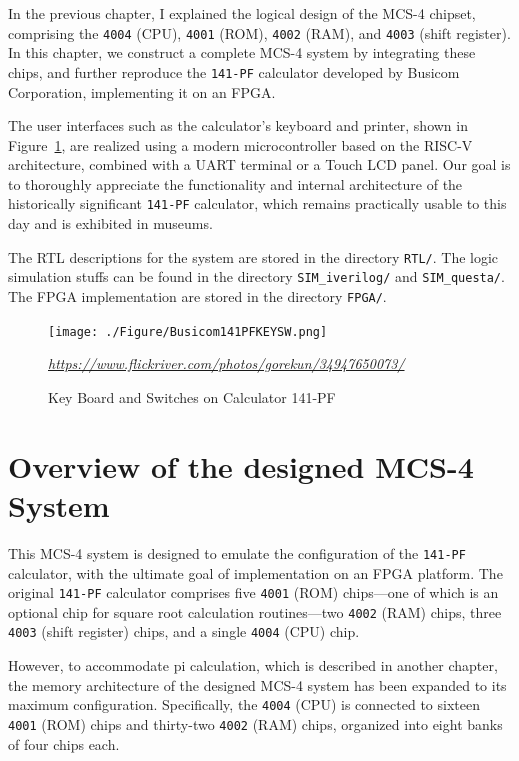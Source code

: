 In the previous chapter, I explained the logical design of the MCS-4 chipset, comprising the \texttt{4004} (CPU), \texttt{4001} (ROM), \texttt{4002} (RAM), and \texttt{4003} (shift register). In this chapter, we construct a complete MCS-4 system by integrating these chips, and further reproduce the \texttt{141-PF} calculator developed by Busicom Corporation, implementing it on an FPGA. 

The user interfaces such as the calculator’s keyboard and printer, shown in Figure~\ref{fig:BUSICOM141PFKEYSW}, are realized using a modern microcontroller based on the RISC-V architecture, combined with a UART terminal or a Touch LCD panel. Our goal is to thoroughly appreciate the functionality and internal architecture of the historically significant \texttt{141-PF} calculator, which remains practically usable to this day and is exhibited in museums.

The RTL descriptions for the system are stored in the directory \texttt{RTL/}. The logic simulation stuffs can be found in the directory \texttt{SIM\_iverilog/} and \texttt{SIM\_questa/}. The FPGA implementation are stored in the directory \texttt{FPGA/}.

\begin{figure}[htbp]
  \texttt{[image: ./Figure/Busicom141PFKEYSW.png]}
  \caption{Key Board and Switches on Calculator 141-PF}
  \label{fig:BUSICOM141PFKEYSW}
  \scriptsize{\textit{\url{https://www.flickriver.com/photos/gorekun/34947650073/}}}
\end{figure}

\section{Overview of the designed MCS-4 System}
This MCS-4 system is designed to emulate the configuration of the \texttt{141-PF} calculator, with the ultimate goal of implementation on an FPGA platform. The original \texttt{141-PF} calculator comprises five \texttt{4001} (ROM) chips—one of which is an optional chip for square root calculation routines—two \texttt{4002} (RAM) chips, three \texttt{4003} (shift register) chips, and a single \texttt{4004} (CPU) chip.

However, to accommodate pi calculation, which is described in another chapter, the memory architecture of the designed MCS-4 system has been expanded to its maximum configuration. Specifically, the \texttt{4004} (CPU) is connected to sixteen \texttt{4001} (ROM) chips and thirty-two \texttt{4002} (RAM) chips, organized into eight banks of four chips each.

